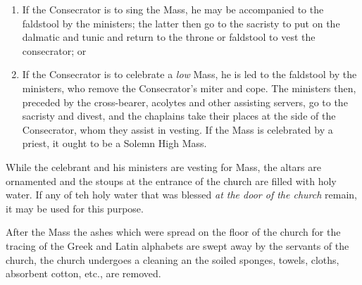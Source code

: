 \documentclass[letterpaper]{report}
\begin{document}
{\begin{enumerate}
    \item If the Consecrator is to sing the Mass, he may be accompanied to the
        faldstool by the ministers; the latter then go to the sacristy to put
        on the dalmatic and tunic and return to the throne or faldstool to vest
        the consecrator; or

    \item If the Consecrator is to celebrate a \textit{low} Mass, he is led to
        the faldstool by the ministers, who remove the Consecrator's miter and
        cope. The ministers then, preceded by the cross-bearer, acolytes and
        other assisting servers, go to the sacristy and divest, and the
        chaplains take their places at the side of the Consecrator, whom they
        assist in vesting. If the Mass is celebrated by a priest, it ought to
        be a Solemn High Mass.
    
\end{enumerate}

While the celebrant and his ministers are vesting for Mass, the altars are
ornamented and the stoups at the entrance of the church are filled with holy
water. If any of teh holy water that was blessed \textit{at the door of the
church} remain, it may be used for this purpose.

After the Mass the ashes which were spread on the floor of the church for the
tracing of the Greek and Latin alphabets are swept away by the servants of the
church, the church undergoes a cleaning an the soiled sponges, towels, cloths,
absorbent cotton, etc., are removed.

}
\end{document}
